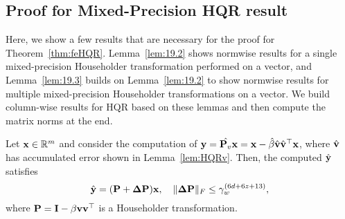 \subsection{Proof for Mixed-Precision HQR result}
\label{Appendix:HQR}
Here, we show a few results that are necessary for the proof for Theorem~\ref{thm:feHQR}.
Lemma~\ref{lem:19.2} shows normwise results for a single mixed-precision Householder transformation performed on a vector, and Lemma~\ref{lem:19.3} builds on Lemma~\ref{lem:19.2} to show normwise results for multiple mixed-precision Householder transformations on a vector. 
We build column-wise results for HQR based on these lemmas and then compute the matrix norms at the end.
\begin{lemma}
	\label{lem:19.2}
	Let $\mathbf{x}\in\mathbb{R}^m$ and consider the computation of $\mathbf{y}=\hat{\mathbf{P}_v}\mathbf{x} = \mathbf{x}-\hat{\beta}\hat{\mathbf{v}}\hat{\mathbf{v}}^{\top}\mathbf{x}$, where $\hat{\mathbf{v}}$ has accumulated error shown in Lemma~\ref{lem:HQRv}.
	Then, the computed $\hat{\mathbf{y}}$ satisfies 
	\begin{equation}
	\hat{\mathbf{y}} = (\mathbf{P}+\mathbf{\Delta P}) \mathbf{x},\quad \|\mathbf{\Delta P}\|_F\leq\gamma_w^{(6d+6z+13)},
	\end{equation}
	where $\mathbf{P} = \mathbf{I}-\beta\mathbf{v}\mathbf{v}^{\top}$ is a Householder transformation.
\end{lemma}
